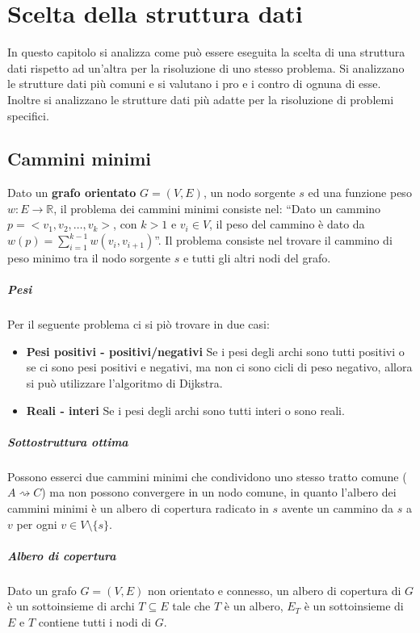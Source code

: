 \chapter{Scelta della struttura dati}
In questo capitolo si analizza come può essere eseguita la scelta di una struttura dati rispetto ad un'altra per la risoluzione di uno stesso problema. Si analizzano le strutture dati più comuni e si valutano i pro e i contro di ognuna di esse. Inoltre si analizzano le strutture dati più adatte per la risoluzione di problemi specifici.

\section{Cammini minimi}
    Dato un \textbf{grafo orientato} $G=(V,E)$, un nodo sorgente $s$ ed una funzione peso $w: E \rightarrow \mathbb{R}$, il problema dei cammini minimi consiste nel: ``Dato un cammino $p=<v_1,v_2,\ldots,v_k>$, con $k>1$ e $v_i \in V$, il peso del cammino è dato da $w(p)=\sum_{i=1}^{k-1} w(v_i,v_{i+1})$''. Il problema consiste nel trovare il cammino di peso minimo tra il nodo sorgente $s$ e tutti gli altri nodi del grafo.
    \paragraph{Pesi} Per il seguente problema ci si piò trovare in due casi:
    \begin{itemize}
        \item \textbf{Pesi positivi - positivi/negativi} Se i pesi degli archi sono tutti positivi o se ci sono pesi positivi e negativi, ma non ci sono cicli di peso negativo, allora si può utilizzare l'algoritmo di Dijkstra.
        \item \textbf{Reali - interi} Se i pesi degli archi sono tutti interi o sono reali.
    \end{itemize}
    \paragraph{Sottostruttura ottima} Possono esserci due cammini minimi che condividono uno stesso tratto comune ($A\rightsquigarrow C$) ma non possono convergere in un nodo comune, in quanto l'albero dei cammini minimi è un albero di copertura radicato in $s$ avente un cammino da $s$ a $v$ per ogni $v \in V\setminus\{s\}$.
    \paragraph{Albero di copertura}
        Dato un grafo $G=(V,E)$ non orientato e connesso, un albero di copertura di $G$ è un sottoinsieme di archi $T \subseteq E$ tale che $T$ è un albero, $E_T$ è un sottoinsieme di $E$ e $T$ contiene tutti i nodi di $G$.
